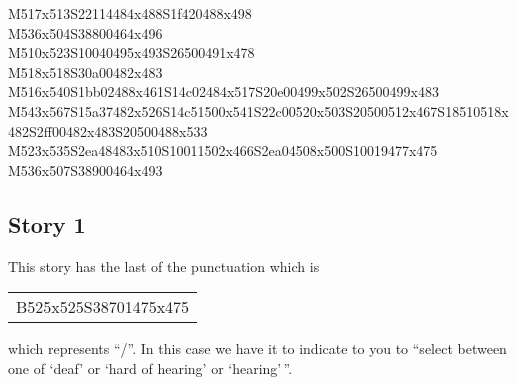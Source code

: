 \documentclass{article}
\begin{document}
\begin{multicols}{5}
\begin{center}
M517x513S22114484x488S1f420488x498 %
\\M536x504S38800464x496 %
\\M510x523S10040495x493S26500491x478 %
\\M518x518S30a00482x483 %
\\M516x540S1bb02488x461S14c02484x517S20e00499x502S26500499x483 %
\\M543x567S15a37482x526S14c51500x541S22c00520x503S20500512x467S18510518x482S2ff00482x483S20500488x533 %
\\M523x535S2ea48483x510S10011502x466S2ea04508x500S10019477x475 %
\\M536x507S38900464x493 %
\vfil

\end{center}
\end{multicols}

\subsection{Story 1}

This story has the last of the punctuation which is \begin{tabular}{c}B525x525S38701475x475\end{tabular} which represents ``/''.
In this case we have it to indicate to you to ``select between one of `deaf' or `hard of hearing' or `hearing'\,''.
\end{document}
